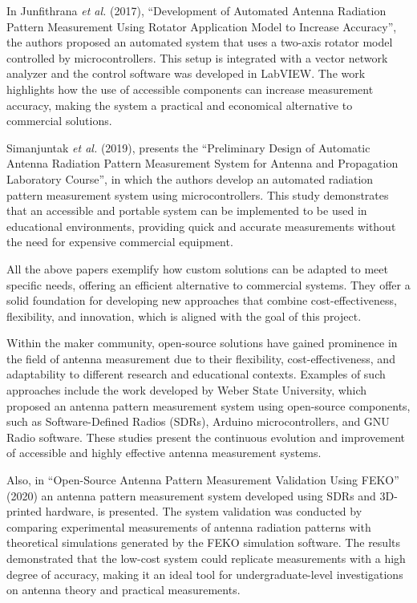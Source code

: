In Junfithrana \textit{et al.} (2017), ``Development of Automated Antenna Radiation Pattern Measurement Using Rotator Application Model to Increase Accuracy'', the authors proposed an automated system that uses a two-axis rotator model controlled by microcontrollers\cite{8308101}. This setup is integrated with a vector network analyzer and the control software was developed in LabVIEW. The work highlights how the use of accessible components can increase measurement accuracy, making the system a practical and economical alternative to commercial solutions.

Simanjuntak \textit{ et al.} (2019), presents the ``Preliminary Design of Automatic Antenna Radiation Pattern Measurement System for Antenna and Propagation Laboratory Course'', in which the authors develop an automated radiation pattern measurement system using microcontrollers\cite{Simanjuntak2019/02}. This study demonstrates that an accessible and portable system can be implemented to be used in educational environments, providing quick and accurate measurements without the need for expensive commercial equipment.


All the above papers exemplify how custom solutions can be adapted to meet specific needs, offering an efficient alternative to commercial systems. They offer a solid foundation for developing new approaches that combine cost-effectiveness, flexibility, and innovation, which is aligned with the goal of this project.


Within the maker community, open-source solutions have gained prominence in the field of antenna measurement due to their flexibility, cost-effectiveness, and adaptability to different research and educational contexts. Examples of such approaches include the work developed by Weber State University, which proposed an antenna pattern measurement system using open-source components, such as Software-Defined Radios (SDRs), Arduino microcontrollers, and GNU Radio software. These studies present the continuous evolution and improvement of accessible and highly effective antenna measurement systems.


Also, in ``Open-Source Antenna Pattern Measurement Validation Using FEKO'' (2020) an antenna pattern measurement system developed using SDRs and 3D-printed hardware, is presented\cite{9196138}. The system validation was conducted by comparing experimental measurements of antenna radiation patterns with theoretical simulations generated by the FEKO simulation software. The results demonstrated that the low-cost system could replicate measurements with a high degree of accuracy, making it an ideal tool for undergraduate-level investigations on antenna theory and practical measurements.


